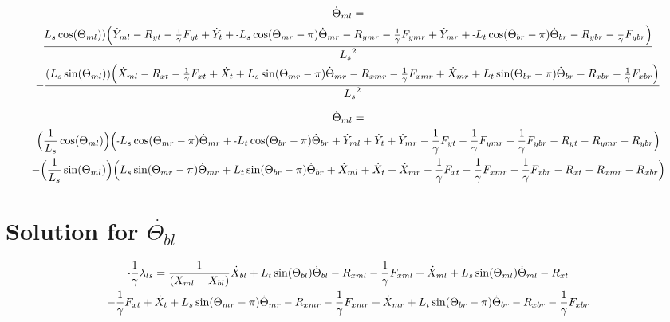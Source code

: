 \documentclass[11pt, landscape]{article}
\newcommand{\mn}{\scalebox{0.7}[1.0]{-}}
\begin{document}
\begin{multline}
\dot{\Theta}_{ml} = \\
\frac{L_{s}\cos(\Theta_{ml})) \Big( \dot{Y}_{ml} - R_{yt} - \frac{1}{\gamma}F_{yt } + \dot{Y}_{t } + \mn L_{s}\cos(\Theta_{mr}-\pi)  \dot{\Theta}_{mr}
- R_{ymr} - \frac{1}{\gamma}F_{ymr} + \dot{Y}_{mr} + \mn L_{t}\cos(\Theta_{br}-\pi)  \dot{\Theta}_{br} - R_{ybr} - \frac{1}{\gamma}F_{ybr}\Big)}
{{L_s}^2} \\
- \frac{(L_{s}\sin(\Theta_{ml}))\Big( \dot{X}_{ml} - R_{xt } - \frac{1}{\gamma}F_{xt } + \dot{X}_{t } + L_{s}\sin(\Theta_{mr}-\pi)  \dot{\Theta}_{mr}
- R_{xmr} - \frac{1}{\gamma}F_{xmr} + \dot{X}_{mr} + L_{t}\sin(\Theta_{br}-\pi)  \dot{\Theta}_{br} - R_{xbr} - \frac{1}{\gamma}F_{xbr} \Big)}
{{L_s}^2}
\end{multline}

\begin{multline}
\dot{\Theta}_{ml} = \\
\Big(\frac{1}{L_s}\cos(\Theta_{ml})\Big) \Big( \mn L_{s}\cos(\Theta_{mr}-\pi)\dot{\Theta}_{mr} + \mn L_{t}\cos(\Theta_{br}-\pi)\dot{\Theta}_{br}
 + \dot{Y}_{ml} + \dot{Y}_{t } + \dot{Y}_{mr} - \frac{1}{\gamma}F_{yt } - \frac{1}{\gamma}F_{ymr} - \frac{1}{\gamma}F_{ybr} - R_{yt} - R_{ymr} - R_{ybr} \Big) \\
- \Big(\frac{1}{L_s}\sin(\Theta_{ml})\Big)\Big(L_{s}\sin(\Theta_{mr}-\pi)  \dot{\Theta}_{mr} + L_{t}\sin(\Theta_{br}-\pi)\dot{\Theta}_{br}
+ \dot{X}_{ml} + \dot{X}_{t } + \dot{X}_{mr} - \frac{1}{\gamma}F_{xt } - \frac{1}{\gamma}F_{xmr} - \frac{1}{\gamma}F_{xbr} - R_{xt } - R_{xmr} - R_{xbr} \Big)
\end{multline}









\section{Solution for $\dot{\Theta_{bl}}$}

\begin{multline}
\mn\frac{1}{\gamma}\lambda_{ls} =
\frac{1}{(X_{ml} - X_{bl})}\dot{X}_{bl} + L_{t}\sin(\Theta_{bl})      \dot{\Theta}_{bl} - R_{xml} - \frac{1}{\gamma}F_{xml} + \dot{X}_{ml} + L_{s}\sin(\Theta_{ml}) \dot{\Theta}_{ml} - R_{xt } \\
- \frac{1}{\gamma}F_{xt } + \dot{X}_{t } + L_{s}\sin(\Theta_{mr}-\pi)  \dot{\Theta}_{mr} - R_{xmr}
-\frac{1}{\gamma}F_{xmr} + \dot{X}_{mr} + L_{t}\sin(\Theta_{br}-\pi)  \dot{\Theta}_{br} - R_{xbr} - \frac{1}{\gamma}F_{xbr}
\end{multline}
\end{document}
